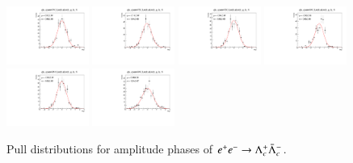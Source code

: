\begin{figure}[h]
    \includegraphics[width=0.24\textwidth]{figure/io/gls/pull_gls_epem4740_Lmdc.aLmdc_g_ls_1i.pdf}
    \includegraphics[width=0.24\textwidth]{figure/io/gls/pull_gls_epem4750_Lmdc.aLmdc_g_ls_1i.pdf}
    \includegraphics[width=0.24\textwidth]{figure/io/gls/pull_gls_epem4780_Lmdc.aLmdc_g_ls_1i.pdf}
    \includegraphics[width=0.24\textwidth]{figure/io/gls/pull_gls_epem4840_Lmdc.aLmdc_g_ls_1i.pdf}
    \includegraphics[width=0.24\textwidth]{figure/io/gls/pull_gls_epem4914_Lmdc.aLmdc_g_ls_1i.pdf}
    \includegraphics[width=0.24\textwidth]{figure/io/gls/pull_gls_epem4946_Lmdc.aLmdc_g_ls_1i.pdf}
    \caption{Pull distributions for amplitude phases of $e^+e^-\rightarrow\Lambda_{c}^{+}\bar{\Lambda}_{c}^{-}$.}
\label{fig:io_pull_phase}
\end{figure}



